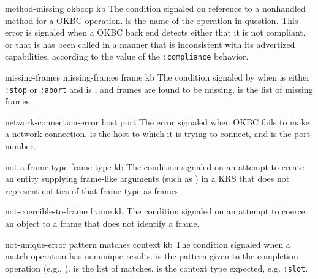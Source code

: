 \begin{okbccondition}{method-missing}{ okbcop kb } {  }
The condition signaled on reference to a nonhandled method for a OKBC
    operation.   is the name of the operation in question.
    This error is signaled when a OKBC back end detects either that it is not
    compliant, or that is has been called in a manner that is inconsistent
    with its advertized capabilities, according to the value of the
    {\tt :compliance} behavior.
\end{okbccondition}

\begin{okbccondition}{missing-frames}{ missing-frames frame kb } {  }
The condition signaled by  when
    is either {\tt :stop} or {\tt :abort}
   and  is \true, and frames are found to be missing.
    is the list of missing
   frames.
\end{okbccondition}

\begin{okbccondition}{network-connection-error}{ host port } {  }
The error signaled when OKBC fails to make a network
    connection.   is the host to which it is trying to connect,
    and  is the port number.
\end{okbccondition}

\begin{okbccondition}{not-a-frame-type}{ frame-type kb } {  }
The condition signaled on an attempt to create an entity supplying
    frame-like arguments (such as ) in a KRS that does
    not represent entities of that frame-type as frames.
\end{okbccondition}

\begin{okbccondition}{not-coercible-to-frame}{ frame kb } {  }
The condition signaled on an attempt to coerce an object to a frame that 
    does not identify a frame.
\end{okbccondition}

\begin{okbccondition}{not-unique-error}{ pattern matches context kb } {  }
The condition signaled when a match operation has nonunique results.
     is the pattern given to the completion operation
    (e.g., ).
     is the list of matches.
     is the context type expected, e.g. {\tt :slot}.
\end{okbccondition}

